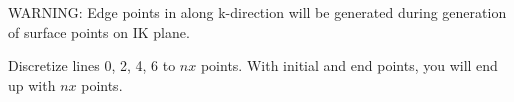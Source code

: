\documentclass{article}
\begin{document}
WARNING: Edge points in along k-direction will be generated during generation of surface points on IK plane.

%
%
%

Discretize lines 0, 2, 4, 6 to $nx$ points. With initial and end points, you will end up with $nx$ points.
\end{document}
